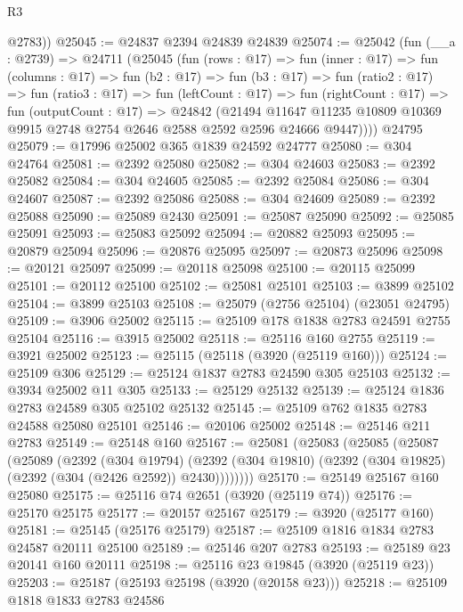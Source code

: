 \begin{lexlean}{R3}
\begin{coremodule}
        @2783))
@25045 := @24837 @2394 @24839 @24839
@25074 := @25042
    (fun (__a : @2739) =>
    @24711
      (@25045
        (fun (rows : @17) =>
        fun (inner : @17) =>
        fun (columns : @17) =>
        fun (b2 : @17) =>
        fun (b3 : @17) =>
        fun (ratio2 : @17) =>
        fun (ratio3 : @17) =>
        fun (leftCount : @17) =>
        fun (rightCount : @17) =>
        fun (outputCount : @17) =>
        @24842
          (@21494
            @11647
            @11235
            @10809
            @10369
            @9915
            @2748
            @2754
            @2646
            @2588
            @2592
            @2596
            @24666
            @9447))))
    @24795
@25079 := @17996 @25002 @365 @1839 @24592 @24777
@25080 := @304 @24764
@25081 := @2392 @25080
@25082 := @304 @24603
@25083 := @2392 @25082
@25084 := @304 @24605
@25085 := @2392 @25084
@25086 := @304 @24607
@25087 := @2392 @25086
@25088 := @304 @24609
@25089 := @2392 @25088
@25090 := @25089 @2430
@25091 := @25087 @25090
@25092 := @25085 @25091
@25093 := @25083 @25092
@25094 := @20882 @25093
@25095 := @20879 @25094
@25096 := @20876 @25095
@25097 := @20873 @25096
@25098 := @20121 @25097
@25099 := @20118 @25098
@25100 := @20115 @25099
@25101 := @20112 @25100
@25102 := @25081 @25101
@25103 := @3899 @25102
@25104 := @3899 @25103
@25108 := @25079 (@2756 @25104) (@23051 @24795)
@25109 := @3906 @25002
@25115 := @25109 @178 @1838 @2783 @24591 @2755 @25104
@25116 := @3915 @25002
@25118 := @25116 @160 @2755
@25119 := @3921 @25002
@25123 := @25115 (@25118 (@3920 (@25119 @160)))
@25124 := @25109 @306
@25129 := @25124 @1837 @2783 @24590 @305 @25103
@25132 := @3934 @25002 @11 @305
@25133 := @25129 @25132
@25139 := @25124 @1836 @2783 @24589 @305 @25102 @25132
@25145 := @25109 @762 @1835 @2783 @24588 @25080 @25101
@25146 := @20106 @25002
@25148 := @25146 @211 @2783
@25149 := @25148 @160
@25167 := @25081
    (@25083
      (@25085
        (@25087
          (@25089
            (@2392
              (@304 @19794)
              (@2392 (@304 @19810) (@2392 (@304 @19825) (@2392 (@304 (@2426 @2592)) @2430))))))))
@25170 := @25149 @25167 @160 @25080
@25175 := @25116 @74 @2651 (@3920 (@25119 @74))
@25176 := @25170 @25175
@25177 := @20157 @25167
@25179 := @3920 (@25177 @160)
@25181 := @25145 (@25176 @25179)
@25187 := @25109 @1816 @1834 @2783 @24587 @20111 @25100
@25189 := @25146 @207 @2783
@25193 := @25189 @23 @20141 @160 @20111
@25198 := @25116 @23 @19845 (@3920 (@25119 @23))
@25203 := @25187 (@25193 @25198 (@3920 (@20158 @23)))
@25218 := @25109
    @1818
    @1833
    @2783
    @24586

\end{coremodule}
\end{lexlean}
